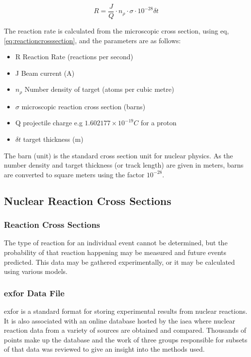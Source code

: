 \begin{equation}
R = \frac{J}{Q} \cdot n_{\rho} \cdot \sigma \cdot 10^{-28} \delta t
\label{eq:reactioncrosssection}
\end{equation}

The reaction rate is calculated from the microscopic cross section, using eq, \ref{eq:reactioncrosssection}, and the parameters are as follows:

\begin{itemize}
\item R	Reaction Rate (reactions per second)
\item J	Beam current (A)
\item $n_{\rho}$	Number density of target (atoms per cubic metre)
\item $\sigma$ microscopic reaction cross section (barns)
\item Q projectile charge e.g $1.602177\times 10^{-19}C$ for a proton 
\item $\delta t$	target thickness (m)
\end{itemize}

The barn (unit) is the standard cross section unit for nuclear physics.  As the number density and target thickness (or track length) are given in meters, barns are converted to square meters using the factor $10^{-28}$.



\subsection{Nuclear Reaction Cross Sections}
\label{section:nuclearxs}
\subsubsection{Reaction Cross Sections}

The type of reaction for an individual event cannot be determined, but the probability of that reaction happening may be measured and future events predicted.  This data may be gathered experimentally, or it may be calculated using various models.


\FloatBarrier

\subsubsection{\Acrlong{exfor} Data File}
\label{section:exfordata}

\Acrfull{exfor} is a standard format for storing experimental results from nuclear reactions\cite{exforarticle}.  It is also associated with an online database hosted by the \acrfull{iaea} where nuclear reaction data from a variety of sources are obtained and compared. Thousands of points make up the database and the work of three groups responsible for subsets of that data was reviewed to give an insight into the methods used.

